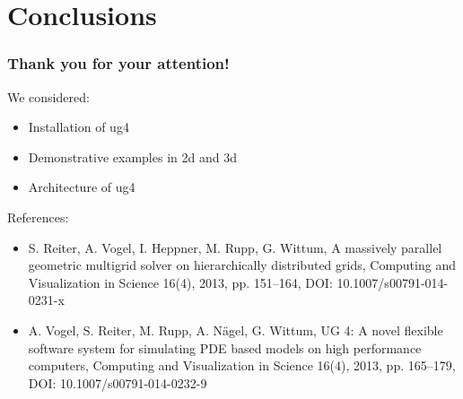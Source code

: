 \documentclass[xcolor=dvipsnames]{beamer}
\begin{document}
\section {Conclusions}

\begin {frame} [t]
\frametitle {Thank you for your attention!}
We considered:
\begin {itemize}
	\item Installation of ug4
	\item Demonstrative examples in 2d and 3d
	\item Architecture of ug4
\end {itemize}

\vspace{15ex}
{\tiny
References:
\begin {itemize}
	\item S. Reiter, A. Vogel, I. Heppner, M. Rupp, G. Wittum, A massively parallel geometric multigrid solver on hierarchically distributed grids, Computing and Visualization in Science 16(4), 2013, pp. 151--164, DOI: 10.1007/s00791-014-0231-x
	\item A. Vogel, S. Reiter, M. Rupp, A. N{\"a}gel, G. Wittum, UG 4: A novel flexible software system for simulating PDE based models on high performance computers, Computing and Visualization in Science 16(4), 2013, pp. 165--179, DOI: 10.1007/s00791-014-0232-9
\end {itemize}
}
\end {frame}
\end{document}
